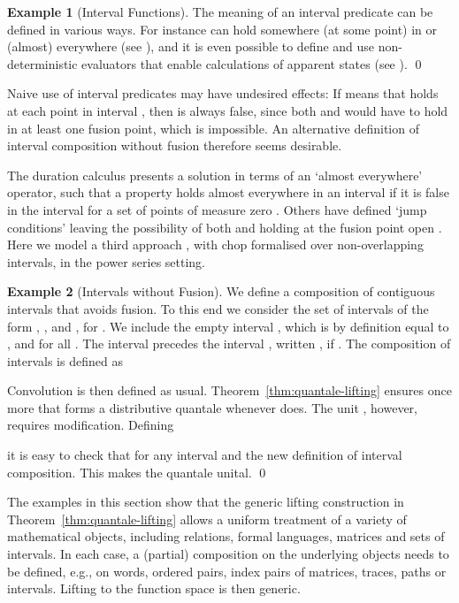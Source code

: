 \documentclass[12pt]{article}
\theoremstyle{definition}
\newtheorem{example}{Example}
\begin{document}
\begin{example}[Interval Functions]
The meaning of an interval predicate  can be defined in
various ways. For instance  can hold somewhere (at some point) in
 or (almost) everywhere (see \cite{Mos00,ZH04}), and it is even
possible to define and use non-deterministic evaluators \cite{HBDJ13}
that enable calculations of apparent states (see \cite{DHD14}). \qed
\end{example}

Naive use of interval predicates may have undesired effects: If  means that  holds at each point in interval , then
 is always false, since both  and  would
have to hold in at least one fusion point, which is impossible. An
alternative definition of interval composition without fusion
therefore seems desirable.

The duration calculus presents a solution in terms of an `almost
everywhere' operator, such that a property holds almost everywhere in
an interval if it is false in the interval for a set of points of
measure zero \cite{ZH04}. Others have defined `jump conditions'
leaving the possibility of both  and  holding at the fusion
point open \cite{HM09}.  Here we model a third approach \cite{DHD14},
with chop formalised over non-overlapping intervals, in the power
series setting.

\begin{example}[Intervals without Fusion]\label{ex:intervals-no-fusion}
  We define a composition of contiguous intervals that avoids
  fusion. To this end we consider the set  of intervals of the
  form , ,  and , for .
  We include the empty interval
  , which is by definition equal to ,  and
   for all .
  The interval  precedes the interval , written ,
  if .
  The composition of intervals is defined as
  

  Convolution  is then defined as
  usual. Theorem~\ref{thm:quantale-lifting} ensures once more that
   forms a distributive quantale whenever  does.  The unit
  , however, requires modification. Defining
  
  it is easy to check that  for any interval  and the new definition of interval
  composition. This makes the quantale  unital. \qed
\end{example}

The examples in this section show that the generic lifting
construction in Theorem~\ref{thm:quantale-lifting} allows a uniform
treatment of a variety of mathematical objects, including relations,
formal languages, matrices and sets of intervals. In each case, a
(partial) composition on the underlying objects needs to be defined,
e.g., on words, ordered pairs, index pairs of matrices, traces, paths
or intervals. Lifting to the function space is then generic.
\end{document}
